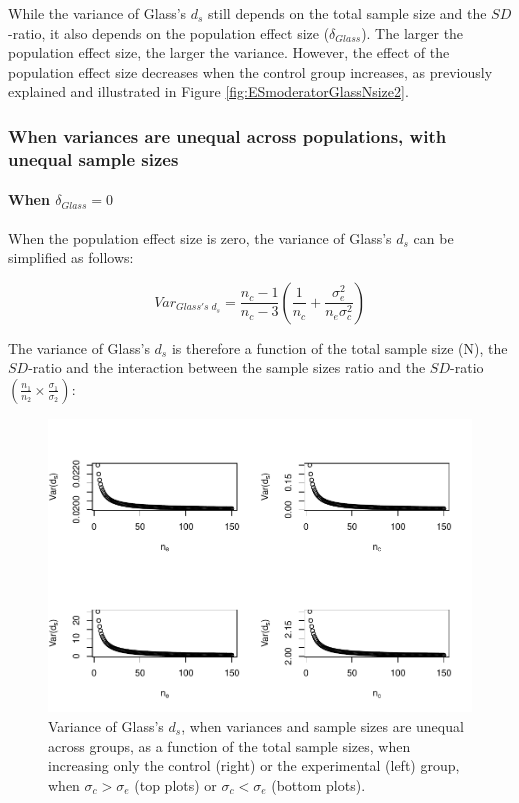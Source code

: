 \documentclass[
  man]{apa6}
\begin{document}
While the variance of Glass's \(d_s\) still depends on the total sample size and the \(SD\)-ratio, it also depends on the population effect size (\(\delta_{Glass}\)). The larger the population effect size, the larger the variance. However, the effect of the population effect size decreases when the control group increases, as previously explained and illustrated in Figure \ref{fig:ESmoderatorGlassNsize2}.

\hypertarget{when-variances-are-unequal-across-populations-with-unequal-sample-sizes}{%
\subsubsection{When variances are unequal across populations, with unequal sample sizes}\label{when-variances-are-unequal-across-populations-with-unequal-sample-sizes}}

\hypertarget{when-delta_glass0-2}{%
\paragraph{\texorpdfstring{When \(\delta_{Glass}=0\)}{When \textbackslash delta\_\{Glass\}=0}}\label{when-delta_glass0-2}}

When the population effect size is zero, the variance of Glass's \(d_s\) can be simplified as follows:

\[Var_{Glass's \; d_s} = \frac{n_c-1}{n_c-3} \left( \frac{1}{n_c}+\frac{\sigma^2_e}{n_e\sigma^2_c}\right)\]

The variance of Glass's \(d_s\) is therefore a function of the total sample size (N), the \(SD\)-ratio and the interaction between the sample sizes ratio and the \(SD\)-ratio \(\left(\frac{n_1}{n_2}\times\frac{\sigma_1}{\sigma_2} \right)\):

\begin{figure}
\centering
\includegraphics{Theoretical-Variance-of-all-estimators-as-a-function-of-population-parameters_files/figure-latex/varglassHetunbalNsize2-1.pdf}
\caption{\label{fig:varglassHetunbalNsize2}Variance of Glass's \(d_s\), when variances and sample sizes are unequal across groups, as a function of the total sample sizes, when increasing only the control (right) or the experimental (left) group, when \(\sigma_c > \sigma_e\) (top plots) or \(\sigma_c < \sigma_e\) (bottom plots).}
\end{figure}
\end{document}
